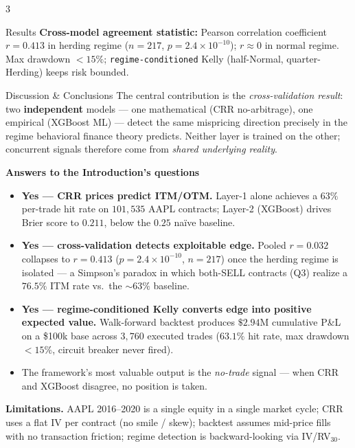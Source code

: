 \documentclass[a0,portrait]{a0poster}
\begin{document}
\begin{multicols}{3}
\begin{posterblock}{Results}
\vspace{0.6em}
\textbf{Cross-model agreement statistic:} Pearson correlation
coefficient $r = 0.413$ in herding regime ($n=217$,
$p = 2.4\times10^{-10}$); $r \approx 0$ in normal regime.
Max drawdown $<15\%$; \texttt{regime-conditioned} Kelly
(half-Normal, quarter-Herding) keeps risk bounded.
\end{posterblock}

\begin{posterblock}{Discussion \& Conclusions}
The central contribution is the \emph{cross-validation result}: two
\textbf{independent} models --- one mathematical (CRR no-arbitrage),
one empirical (XGBoost ML) --- detect the same mispricing direction
precisely in the regime behavioral finance theory predicts. Neither
layer is trained on the other; concurrent signals therefore come from
\emph{shared underlying reality}.

\vspace{0.5em}
\textbf{Answers to the Introduction's questions}
\begin{itemize}[leftmargin=1.4em,itemsep=4pt,topsep=4pt]
  \item \textbf{Yes --- CRR prices predict ITM/OTM.} Layer-1 alone
        achieves a $63\%$ per-trade hit rate on $101{,}535$ AAPL
        contracts; Layer-2 (XGBoost) drives Brier score to $0.211$,
        below the $0.25$ naïve baseline.
  \item \textbf{Yes --- cross-validation detects exploitable edge.}
        Pooled $r=0.032$ collapses to $r=\mathbf{0.413}$
        ($p=2.4\times10^{-10}$, $n=217$) once the herding regime is
        isolated --- a Simpson's paradox in which both-SELL contracts
        (Q3) realize a $76.5\%$ ITM rate vs.\ the $\sim 63\%$ baseline.
  \item \textbf{Yes --- regime-conditioned Kelly converts edge into
        positive expected value.} Walk-forward backtest produces
        $\mathbf{\$2.94}$M cumulative P\&L on a \$100k base across
        $3{,}760$ executed trades ($63.1\%$ hit rate, max drawdown
        $<15\%$, circuit breaker never fired).
  \item The framework's most valuable output is the \emph{no-trade}
        signal --- when CRR and XGBoost disagree, no position is taken.
\end{itemize}

\vspace{0.3em}
\textbf{Limitations.} AAPL 2016--2020 is a single equity in a single
market cycle; CRR uses a flat IV per contract (no smile / skew);
backtest assumes mid-price fills with no transaction friction; regime
detection is backward-looking via IV/RV$_{30}$.


\end{posterblock}
\end{multicols}
\end{document}
